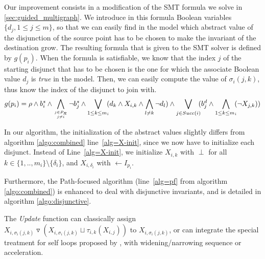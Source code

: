 \documentclass{llncs}
\newcommand{\widening}{\mathop{\triangledown}}
\begin{document}
Our improvement consists in a modification of the SMT formula we solve in
\ref{sec:guided_multigraph}.
We introduce in this formula Boolean variables $\{d_j, 1 \leq j \leq m\}$, so
that we can easily find in the model which abstract value of the
disjunction of the source point has
to be chosen to make the invariant of the destination grow.
The resulting formula that is given to the SMT solver is defined
by $g(p_i)$.
When the formula is satisfiable, we know that the index $j$ of the starting
disjunct that has to be chosen is the one for which the associate Boolean value
$d_j$ is \emph{true} in the model. Then, we can easily compute the value of 
$\sigma_i(j,k)$, thus know the index of the disjunct to join with.
%
\vspace{-.5em}
\begin{equation*}
g(p_i) = \rho \wedge b_i^s \wedge 
\displaystyle\bigwedge_{j \in P_R \atop j \neq i} \neg b_j^s 
 \wedge 
\displaystyle\bigvee_{1 \leq k \leq m_i}\!\! (d_k \wedge X_{i,k} \wedge \bigwedge_{l \neq k}
\neg d_l)
\wedge
\displaystyle\bigvee_{j \in Succ(i)}\!\!
(b_j^d \wedge \bigwedge_{1 \leq k \leq m_i}\!\! (\neg X_{j,k}))
\vspace{-.5em}
\end{equation*}

In our algorithm, the initialization of the abstract values slightly differs from
algorithm \ref{algo:combined} line~\ref{alg=X-init}, since we now have to
initialize each disjunct. Instead of Line~\ref{alg=X-init}, we initialize $X_{i,k}$ with $\perp$ for all
$k \in \{1,..,m_i\} \setminus \{\delta_i\}$, and $X_{i,\delta_i}$ with
$\gets I_{p_i}$.


Furthermore, the Path-focused algorithm (line~\ref{alg=pf} from algorithm
\ref{algo:combined}) is enhanced to deal with disjunctive invariants, and
is detailed in algorithm \ref{algo:disjunctive}.

The \emph{Update} function can classically assign  $X_{i,\sigma_i(j,k)} \widening (X_{i,\sigma_i(j,k)} \sqcup
\tau_{i,k}(X_{i,j}))$ to $X_{i,\sigma_i(j,k)}$, or can integrate the special treatment for self loops
proposed by \cite{Monniaux_Gonnord_SAS11}, with widening/narrowing sequence or
acceleration.
\end{document}
